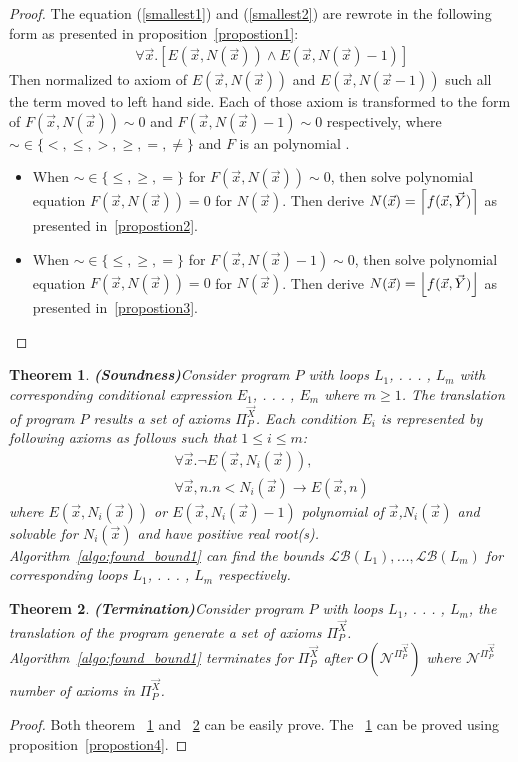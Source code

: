 \documentclass{article}
\DeclarePairedDelimiter\ceil{\lceil}{\rceil}
\DeclarePairedDelimiter\floor{\lfloor}{\rfloor}
\newtheorem{theorem}{Theorem}
\begin{document}
\begin{proof}
The equation (\ref{smallest1}) and (\ref{smallest2}) are rewrote in the following form as presented in proposition~\ref{propostion1}:
\begin{eqnarray}
    &&\forall \vec{x}.[E(\vec{x},N(\vec{x})) \land E(\vec{x},N(\vec{x})-1)] \label{smallest3}
\end{eqnarray}
Then normalized to axiom of $E(\vec{x},N(\vec{x}))$ and $E(\vec{x},N(\vec{x}-1))$ such all the term moved to left hand side. Each of those axiom is transformed to the form of $F(\vec{x},N(\vec{x}))\sim 0$ and $F(\vec{x},N(\vec{x})-1)\sim 0$ respectively, where  $\sim \in \{<, \leq, >, \geq, =, \not=\}$ and $F$ is an polynomial .
\begin{itemize}
    \item When $\sim \in \{\leq, \geq, =\}$ for $F(\vec{x},N(\vec{x}))\sim 0$, then solve polynomial equation $F(\vec{x},N(\vec{x}))= 0$ for $N(\vec{x})$. 
    Then derive $N(\vec{x}) = \ceil*{f(\vec{x},\vec{Y})}$ as presented in~\ref{propostion2}.
    \item When $\sim \in \{\leq, \geq, =\}$ for $F(\vec{x},N(\vec{x})-1)\sim 0$, then solve polynomial equation $F(\vec{x},N(\vec{x}))= 0$ for $N(\vec{x})$. 
    Then derive $N(\vec{x}) = \floor*{f(\vec{x},\vec{Y})}$ as presented in~\ref{propostion3}.
\end{itemize}
\end{proof}

\begin{theorem}\textbf{(Soundness)}\label{thm1}
Consider program $P$ with loops $L_1$, . . . , $L_m$ with corresponding conditional expression $E_1$, . . . , $E_m$ where $m\geq 1$.  The translation of program $P$ results a set of axioms $\Pi^{\vec{X}}_{P}$. Each condition $E_i$ is represented by following axioms as follows such that $1\leq i \leq m$:
\begin{eqnarray}
&&  \forall \vec{x}.\neg E(\vec{x},N_i(\vec{x})), \label{smallest7}\\
&& \forall \vec{x},n. n< N_i(\vec{x})\rightarrow  E(\vec{x},n) \label{smallest8}
\end{eqnarray}
where $E(\vec{x},N_i(\vec{x}))$ or $E(\vec{x},N_i(\vec{x})-1)$ polynomial of $\vec{x}$,$N_i(\vec{x})$ and solvable for $N_i(\vec{x})$ and have positive real root(s).
Algorithm~\ref{algo:found_bound1} can find the bounds  $\mathcal{LB}(L_1),$...$,\mathcal{LB}(L_m)$ for corresponding loops  $L_1$, . . . , $L_m$ respectively.
\end{theorem}
\begin{theorem}\textbf{(Termination)}\label{thm2}
Consider program $P$ with loops $L_1$, . . . , $L_m$, the translation of the program generate a set of axioms $\Pi_{P}^{\vec{X}}$. Algorithm~\ref{algo:found_bound1} terminates for $\Pi_{P}^{\vec{X}}$ after $O(\mathcal{N}^{\Pi_{P}^{\vec{X}}})$ where $\mathcal{N}^{\Pi_{P}^{\vec{X}}}$ number of axioms in $\Pi_{P}^{\vec{X}}$.
\end{theorem}
\begin{proof}
Both theorem ~\ref{thm1} and ~\ref{thm2} can be easily prove. The ~\ref{thm1} can be proved using proposition~\ref{propostion4}.
\end{proof}
\end{document}
